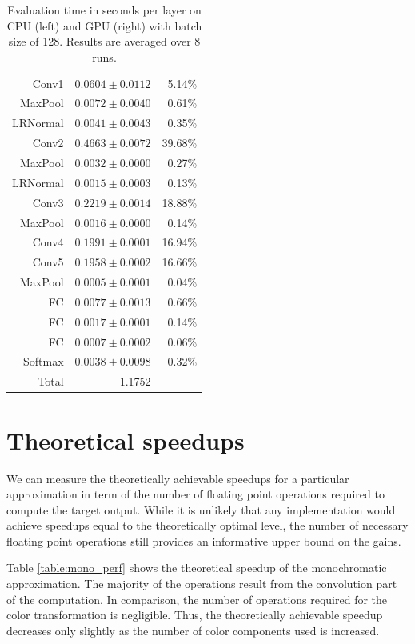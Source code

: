 \documentclass{article} %
\begin{document}
\begin{table}[h]
{\begin{tabular}{rrr}
\hline
Conv1 & $0.0604 \pm 0.0112$ & 5.14\% \\
MaxPool & $0.0072 \pm 0.0040$ & 0.61\% \\
LRNormal & $0.0041 \pm 0.0043$ &  0.35\% \\
Conv2 & $0.4663 \pm 0.0072$ & 39.68\% \\
MaxPool & $0.0032 \pm 0.0000$ &  0.27\% \\
LRNormal & $0.0015 \pm 0.0003$ & 0.13\% \\
Conv3 & $0.2219 \pm 0.0014$ & 18.88\% \\
MaxPool & $0.0016 \pm 0.0000$ & 0.14\% \\
Conv4 & $0.1991 \pm 0.0001$ & 16.94\% \\
Conv5 & $0.1958 \pm 0.0002$ &  16.66\% \\
MaxPool & $0.0005  \pm 0.0001$ & 0.04\% \\
FC & $0.0077 \pm 0.0013$ & 0.66\% \\
FC & $0.0017 \pm 0.0001$ & 0.14\% \\
FC & $0.0007 \pm 0.0002$  & 0.06\% \\
Softmax & $0.0038 \pm 0.0098$ & 0.32\%\\
\hline 
Total & 1.1752 & \\
\hline
\end{tabular}
}
\caption{Evaluation time in seconds per layer on CPU (left)
  and GPU (right) with batch size of 128. Results are averaged over 8
  runs.} 
\label{evaluation_time}
\end{table}


\section{Theoretical speedups}
We can measure the theoretically achievable speedups for a particular approximation in term of the number of floating point operations required to compute the target output.
While it is unlikely that any implementation would achieve speedups equal to the theoretically optimal level, the number of necessary floating point operations still provides an informative upper bound on the gains.

Table \ref{table:mono_perf} shows the theoretical speedup of the monochromatic approximation. 
The majority of the operations result from the convolution part of the computation. 
In comparison, the number of operations required for the color transformation is negligible. 
Thus, the theoretically achievable speedup decreases only slightly as the number of color components used is increased. 
\end{document}
